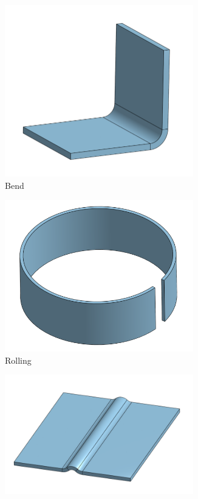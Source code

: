  	\begin{figure}[H]
		\centering
		\begin{subfigure}[b]{.24\linewidth}
			\includegraphics[width=0.9\textwidth]{imgs/sheet_bend.png}
			\caption{Bend}
		\end{subfigure}\begin{subfigure}[b]{.24\linewidth}
			\includegraphics[width=0.9\textwidth]{imgs/sheet_roll.png}
			\caption{Rolling}
		\end{subfigure}\begin{subfigure}[b]{.24\linewidth}
			\includegraphics[width=0.9\textwidth]{imgs/sheet_beadroll.png}

\end{subfigure}
\end{figure}
